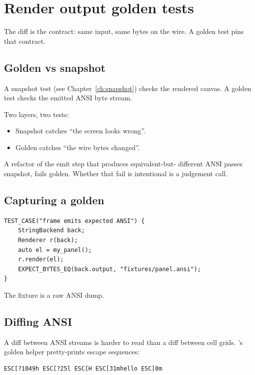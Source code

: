 \chapter{Render output golden tests}
\label{ch:golden}

\begin{aside}
The diff is the contract: same input, same bytes on the wire.
A golden test pins that contract.
\end{aside}

\section{Golden vs snapshot}

A snapshot test (see Chapter~\ref{ch:snapshot}) checks the rendered
canvas. A golden test checks the emitted ANSI byte stream.

Two layers, two tests:

\begin{itemize}[leftmargin=*]
  \item Snapshot catches ``the screen looks wrong''.
  \item Golden catches ``the wire bytes changed''.
\end{itemize}

A refactor of the emit step that produces equivalent-but-
different ANSI passes snapshot, fails golden. Whether that
fail is intentional is a judgement call.

\section{Capturing a golden}

\begin{lstlisting}
TEST_CASE("frame emits expected ANSI") {
    StringBackend back;
    Renderer r(back);
    auto el = my_panel();
    r.render(el);
    EXPECT_BYTES_EQ(back.output, "fixtures/panel.ansi");
}
\end{lstlisting}

The fixture is a raw ANSI dump.

\section{Diffing ANSI}

A diff between ANSI streams is harder to read than a diff
between cell grids. \maya{}'s golden helper pretty-prints
escape sequences:

\begin{lstlisting}
ESC[?1049h ESC[?25l ESC[H ESC[31mhello ESC[0m
\end{lstlisting}

